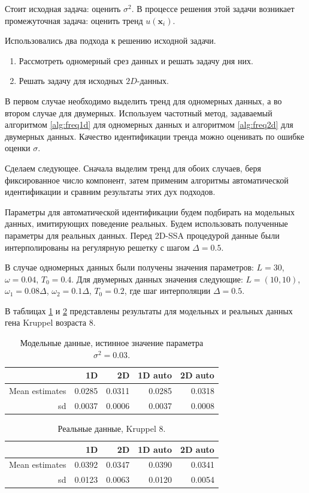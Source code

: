\documentclass[specialist,
               substylefile = spbu.rtx,
               subf,href,colorlinks=true, 12pt]{disser}
\begin{document}
Стоит исходная задача: оценить $\sigma^2$. В процессе решения этой задачи возникает промежуточная задача: оценить тренд $ u(\mathbf{x}_i)$.

Использовались два подхода к решению исходной задачи.
\begin{enumerate}
  \item Рассмотреть одномерный срез данных и решать задачу дня них.
  \item Решать задачу для исходных $2D$-данных.
\end{enumerate}
В первом случае необходимо выделить тренд для одномерных данных, а во втором случае для двумерных.
Используем частотный метод, задаваемый алгоритмом \ref{alg:freq1d} для одномерных данных и алгоритмом \ref{alg:freq2d} для двумерных данных.
Качество идентификации тренда можно оценивать по ошибке оценки $\sigma$.

Сделаем следующее. Сначала выделим тренд для обоих случаев, беря фиксированное число компонент, затем применим алгоритмы автоматической идентификации и сравним результаты этих дух подходов.

Параметры для автоматической идентификации будем подбирать на модельных данных,
имитирующих поведение реальных. Будем использовать полученные параметры для реальных данных.
Перед 2D-SSA процедурой данные были интерполированы на регулярную решетку с шагом $\Delta = 0.5$.

В случае одномерных данных были получены значения параметров: $L=30$, $\omega=0.04$, $T_0=0.4$.
Для двумерных данных значения следующие:  $L=(10,10)$, $\omega_{1}=0.08 \Delta$,
  $\omega_{2}=0.1 \Delta$, $T_0=0.2$, где шаг интерполяции $\Delta = 0.5$.

В таблицах \ref{tab:model_est_compare} и \ref{tab:real_est_compare} представлены результаты для модельных и реальных данных гена Kruppel возраста 8.

 \begin{table}[hhh!]
\caption{Модельные данные, истинное значение параметра $\sigma^2=0.03$.}
 \centering
 \begin{tabular}{rrrrr}
  \hline
  & 1D  & 2D  & 1D auto  & 2D auto \\
  \hline
  Mean estimates & 0.0285 & 0.0311 & 0.0285 & 0.0318 \\
  sd & 0.0037 & 0.0006 & 0.0037 & 0.0008 \\
 \end{tabular}
  \label{tab:model_est_compare}
 \end{table}
  \begin{table}[hhh!]
\caption{Реальные данные, Kruppel 8.}
 \centering
 \begin{tabular}{rrrrr}
  \hline
  & 1D  & 2D   & 1D auto & 2D auto \\
  \hline
  Mean estimates & 0.0392 & 0.0347 & 0.0390 & 0.0341 \\
  sd & 0.0123 & 0.0063 & 0.0120 & 0.0054 \\
 \end{tabular}
 \label{tab:real_est_compare}
 \end{table}
\end{document}
